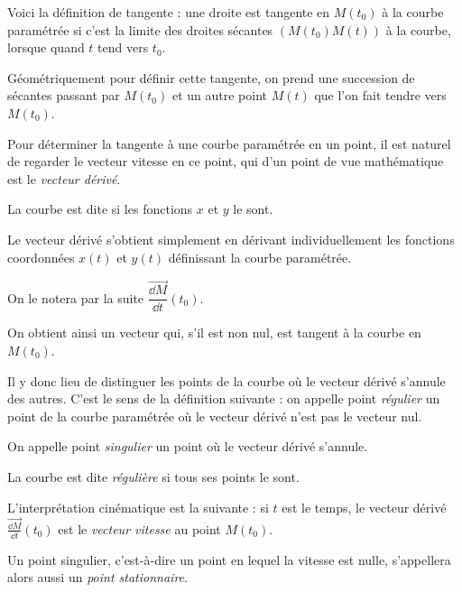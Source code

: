 \diapo

Voici la définition de tangente : une droite est tangente en $M(t_0)$ 
à la courbe paramétrée si c'est la limite des droites sécantes 
$(M(t_0)M(t))$ à la courbe, lorsque quand $t$ tend vers $t_0$. 

Géométriquement pour définir cette tangente, on prend une succession 
de sécantes passant par $M(t_0)$ et un autre point $M(t)$ que l'on fait tendre vers $M(t_0)$.

\change
\change
\change
\change
\change

\diapo


Pour déterminer la tangente à une courbe paramétrée en un point, 
il est naturel de regarder le \og{}vecteur vitesse\fg{} en ce point, 
qui d'un point de vue mathématique est le \emph{vecteur dérivé}. 

\change
La courbe est dite  si les fonctions 
$x$ et $y$ le sont.

\change

Le vecteur dérivé s'obtient simplement en dérivant individuellement les 
fonctions coordonnées $x(t)$ et $y(t)$ définissant la courbe paramétrée. 


\change

On le notera par la suite 
$\overrightarrow{\dfrac{\dd M}{\dd t}}(t_0)$.

\change

On obtient ainsi un vecteur qui, s'il est non nul, 
est tangent à la courbe en $M(t_0)$.


\diapo

Il y donc lieu de distinguer les points de la courbe où le 
vecteur dérivé s'annule des autres. C'est le sens de la définition suivante : 
on appelle point \emph{régulier} un point de la courbe paramétrée 
où le vecteur dérivé n'est pas le vecteur nul.

\change
On appelle point \emph{singulier} un point où le vecteur 
dérivé s'annule.  


\change
La courbe est dite \emph{régulière} si tous ses points le sont.


L'interprétation cinématique est la suivante : si $t$ est le temps,  
le vecteur dérivé $\overrightarrow{\frac{\dd M}{\dd t}}(t_0)$ est  
le \emph{vecteur vitesse} au point $M(t_0)$.  

Un point singulier, c'est-à-dire un point en lequel 
la vitesse est nulle, s’appellera alors aussi un \emph{point stationnaire}.


